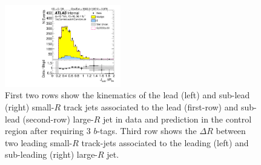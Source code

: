 \begin{figure}[htbp!]
\begin{center}
\includegraphics[angle=270, width=0.45\textwidth]{./figures/boosted/Control/b77_ThreeTag_Control_sublHCand_trk_dr.pdf}
  \caption{First two rows show the kinematics of the lead (left) and sub-lead (right) small-$R$ track jets associated to the lead (first-row) and sub-lead (second-row) large-$R$ jet in data and prediction in the control region after requiring 3 $b$-tags. Third row shows the $\Delta R$ between two leading small-$R$ track-jets associated to the leading (left) and sub-leading (right) large-$R$ jet.  }
  \label{fig:boosted-3b-control-ak2}
\end{center}
\end{figure}


